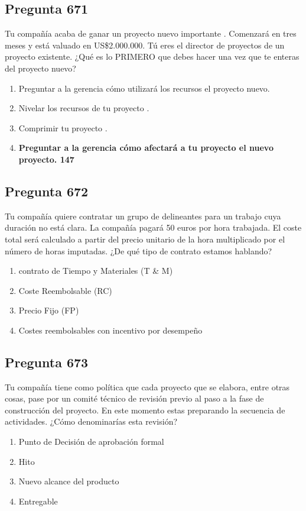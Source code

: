 \documentclass[11pt,a4paper]{article}
\begin{document}
\subsection*{Pregunta 671}
Tu compañía acaba de ganar un proyecto nuevo importante . Comenzará en tres meses y está valuado en US\$2.000.000. Tú eres el director de proyectos de un proyecto existente. ¿Qué es lo PRIMERO que debes hacer una vez que te enteras del proyecto nuevo?

\begin{enumerate}[label=\alph*)]
  \item Preguntar a la gerencia cómo utilizará los recursos el proyecto nuevo.
  \item Nivelar los recursos de tu proyecto .
  \item Comprimir tu proyecto .
  \item \textbf{Preguntar a la gerencia cómo afectará a tu proyecto el nuevo proyecto. 147}
\end{enumerate}

\subsection*{Pregunta 672}
Tu compañía quiere contratar un grupo de delineantes para un trabajo cuya duración no está clara. La compañía pagará 50 euros por hora trabajada. El coste total será calculado a partir del precio unitario de la hora multiplicado por el número de horas imputadas. ¿De qué tipo de contrato estamos hablando?

\begin{enumerate}[label=\alph*)]
  \item contrato de Tiempo y Materiales (T \& M)
  \item Coste Reembolsable (RC)
  \item Precio Fijo (FP)
  \item Costes reembolsables con incentivo por desempeño
\end{enumerate}

\subsection*{Pregunta 673}
Tu compañía tiene como política que cada proyecto que se elabora, entre otras cosas, pase por un comité técnico de revisión previo al paso a la fase de construcción del proyecto. En este momento estas preparando la secuencia de actividades. ¿Cómo denominarías esta revisión?

\begin{enumerate}[label=\alph*)]
  \item Punto de Decisión de aprobación formal
  \item Hito
  \item Nuevo alcance del producto
  \item Entregable
\end{enumerate}
\end{document}

